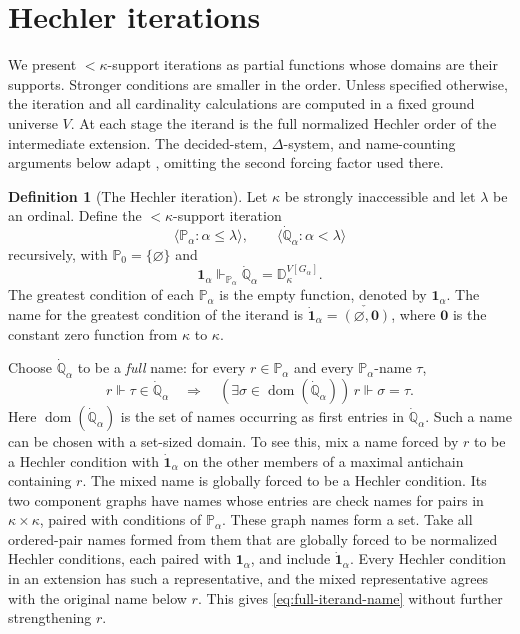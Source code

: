 \documentclass[10pt,a4paper]{amsart}
\theoremstyle{definition}
\newtheorem{definition}[theorem]{Definition}
\theoremstyle{remark}
\newcommand{\D}{\mathbb D}
\newcommand{\PP}{\mathbb P}
\DeclareMathOperator{\dom}{dom}
\begin{document}
\section{Hechler iterations}
\label{sec:iteration}

We present \(<\kappa\)-support iterations as partial functions
whose domains are their supports. Stronger conditions are smaller
in the order. Unless specified otherwise, the iteration and all
cardinality calculations are computed in a fixed ground universe
\(V\). At each stage the iterand is the full normalized Hechler
order of the intermediate extension. The decided-stem,
\(\Delta\)-system, and name-counting arguments below adapt
\cite[Lemma 3.10]{Schuerz}, omitting the second forcing factor
used there.

\begin{definition}[The Hechler iteration]\label{def:iteration}
Let \(\kappa\) be strongly inaccessible and let \(\lambda\) be
an ordinal. Define the \(<\kappa\)-support iteration
\[
 \langle\PP_\alpha:\alpha\leq\lambda\rangle,
 \qquad\langle\dot{\mathbb Q}_\alpha:\alpha<\lambda\rangle
\]
recursively, with \(\PP_0=\{\varnothing\}\) and
\[
 \mathbf1_\alpha\Vdash_{\PP_\alpha}
 \dot{\mathbb Q}_\alpha=\D_\kappa^{V[G_\alpha]}.
\]
The greatest condition of each \(\PP_\alpha\) is the empty
function, denoted by \(\mathbf1_\alpha\). The name for the
greatest condition of the iterand is
\(\dot{\mathbf1}_\alpha=\check{(\varnothing,\mathbf0)}\),
where \(\mathbf0\) is the constant zero function from
\(\kappa\) to \(\kappa\).

Choose \(\dot{\mathbb Q}_\alpha\) to be a \emph{full} name:
for every \(r\in\PP_\alpha\) and every
\(\PP_\alpha\)-name \(\tau\),
\begin{equation}\label{eq:full-iterand-name}
 r\Vdash\tau\in\dot{\mathbb Q}_\alpha
 \quad\Longrightarrow\quad
 (\exists\sigma\in\dom(\dot{\mathbb Q}_\alpha))\,
                         r\Vdash\sigma=\tau.
\end{equation}
Here \(\dom(\dot{\mathbb Q}_\alpha)\) is the set of names
occurring as first entries in \(\dot{\mathbb Q}_\alpha\).
Such a name can be chosen with a set-sized domain. To see this,
mix a name forced by \(r\) to be a Hechler condition with
\(\dot{\mathbf1}_\alpha\) on the other members of a maximal
antichain containing \(r\). The mixed name is globally forced
to be a Hechler condition. Its two component graphs have names
whose entries are check names for pairs in \(\kappa\times\kappa\),
paired with conditions of \(\PP_\alpha\). These graph names form
a set. Take all ordered-pair names formed from them that are
globally forced to be normalized Hechler conditions, each paired
with \(\mathbf1_\alpha\), and include
\(\dot{\mathbf1}_\alpha\). Every Hechler condition in an extension
has such a representative, and the mixed representative agrees
with the original name below \(r\). This gives
\eqref{eq:full-iterand-name} without further strengthening \(r\).


\end{definition}
\end{document}
